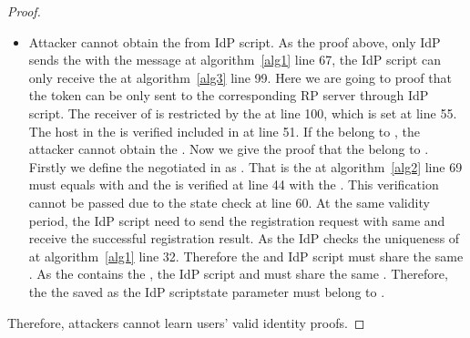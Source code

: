 \begin{appendices}
\begin{proof}
\begin{itemize}
\item Attacker cannot obtain the  from IdP script. As the proof above, only IdP sends the  with the message at algorithm~\ref{alg1} line 67, the IdP script can only receive the  at algorithm~\ref{alg3} line 99. Here we are going to proof that the token  can be only sent to the corresponding RP server through IdP script. The receiver of  is restricted by the  at line 100, which is set at line 55. The host in the  is verified included in  at line 51. If the  belong to , the attacker cannot obtain the . Now we give the proof that the  belong to . Firstly we define the negotiated  in  as . That is the  at algorithm~\ref{alg2} line 69 must equals with  and the  is verified at line 44 with the . This verification cannot be passed due to the state check at line 60. At the same validity period, the IdP script need to send the registration request with same   and receive the successful registration result. As the IdP checks the uniqueness of  at algorithm~\ref{alg1} line 32. Therefore the  and IdP script must share the same . As the  contains the , the IdP script and  must share the same . Therefore, the the  saved as the IdP scriptstate parameter must belong to .
\end{itemize}
Therefore, attackers cannot  learn users' valid identity proofs.
\end{proof}



\end{appendices}
